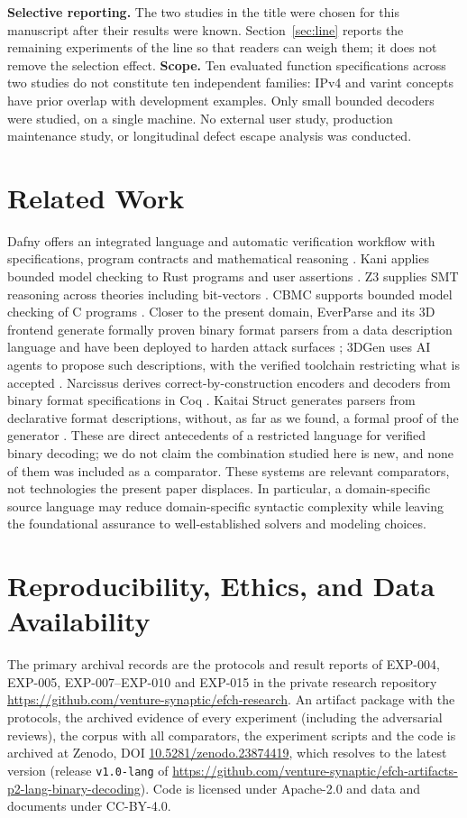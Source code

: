 \documentclass[10pt,twocolumn]{article}
\begin{document}
\textbf{Selective reporting.} The two studies in the title were chosen for this manuscript after their results were known. Section~\ref{sec:line} reports the remaining experiments of the line so that readers can weigh them; it does not remove the selection effect. \textbf{Scope.} Ten evaluated function specifications across two studies do not constitute ten independent families: IPv4 and varint concepts have prior overlap with development examples. Only small bounded decoders were studied, on a single machine. No external user study, production maintenance study, or longitudinal defect escape analysis was conducted.

\section{Related Work}
Dafny offers an integrated language and automatic verification workflow with specifications, program contracts and mathematical reasoning \cite{dafny}. Kani applies bounded model checking to Rust programs and user assertions \cite{kani}. Z3 supplies SMT reasoning across theories including bit-vectors \cite{z3}. CBMC supports bounded model checking of C programs \cite{cbmc}. Closer to the present domain, EverParse and its 3D frontend generate formally proven binary format parsers from a data description language and have been deployed to harden attack surfaces \cite{everparse3d}; 3DGen uses AI agents to propose such descriptions, with the verified toolchain restricting what is accepted \cite{3dgen}. Narcissus derives correct-by-construction encoders and decoders from binary format specifications in Coq \cite{narcissus}. Kaitai Struct generates parsers from declarative format descriptions, without, as far as we found, a formal proof of the generator \cite{kaitai}. These are direct antecedents of a restricted language for verified binary decoding; we do not claim the combination studied here is new, and none of them was included as a comparator. These systems are relevant comparators, not technologies the present paper displaces. In particular, a domain-specific source language may reduce domain-specific syntactic complexity while leaving the foundational assurance to well-established solvers and modeling choices.

\section{Reproducibility, Ethics, and Data Availability}
The primary archival records are the protocols and result reports of EXP-004, EXP-005, EXP-007--EXP-010 and EXP-015 in the private research repository \url{https://github.com/venture-synaptic/efch-research}. An artifact package with the protocols, the archived evidence of every experiment (including the adversarial reviews), the corpus with all comparators, the experiment scripts and the code is archived at Zenodo, DOI \href{https://doi.org/10.5281/zenodo.23874419}{10.5281/zenodo.23874419}, which resolves to the latest version (release \texttt{v1.0-lang} of \url{https://github.com/venture-synaptic/efch-artifacts-p2-lang-binary-decoding}). Code is licensed under Apache-2.0 and data and documents under CC-BY-4.0.
\end{document}
